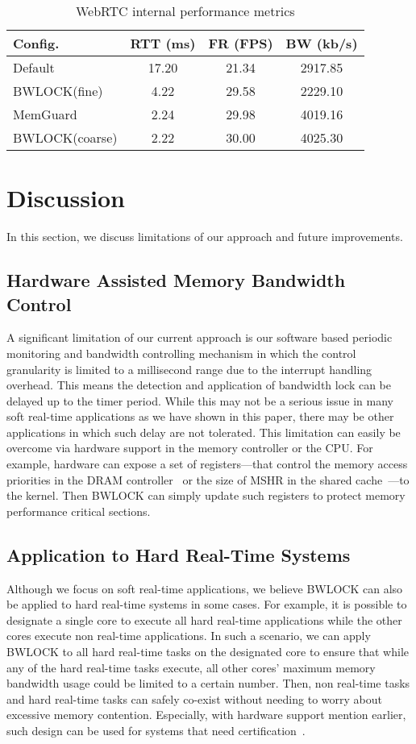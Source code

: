 \documentclass[times, 10pt,onecolumn]{article}
\newcommand{\bottomrule}{\hline}
\newcommand{\toprule}{\hline}
\newcommand{\midrule}{\hline}
\begin{document}
\begin{table}[htbp]
\centering
\begin{tabular}{lccc}
\toprule
Config. & RTT (ms) & FR (FPS) & BW (kb/s) \\
\midrule
Default & 17.20 & 21.34 & 2917.85 \\
BWLOCK(fine) & 4.22 & 29.58 & 2229.10 \\
MemGuard & 2.24 & 29.98 & 4019.16 \\
BWLOCK(coarse) & 2.22 & 30.00 & 4025.30 \\
\bottomrule
\end{tabular}\caption{WebRTC internal performance metrics}
\label{tbl:webrtc-metrics}\end{table}



\section{Discussion} \label{sec:discussion}
In this section, we discuss limitations of our approach and future
improvements. 

\subsection{Hardware Assisted Memory Bandwidth Control}
A significant limitation of our current approach is our software based
periodic monitoring and bandwidth controlling mechanism in which the
control granularity is limited to a millisecond range due to the
interrupt handling overhead. This means the detection and application
of bandwidth lock can be delayed up to the timer period. While this
may not be a serious issue in many soft real-time applications as we
have shown in this paper, there may be other applications in which such
delay are not tolerated. This limitation can easily be overcome via
hardware support in the memory controller or the CPU. For example, 
hardware can expose a set of registers---that control the memory
access priorities in the DRAM controller~\cite{kim2010thread} or the
size of MSHR in the shared cache~\cite{ebrahimi2010fairness}---to the
kernel. Then BWLOCK can simply update such registers to protect memory
performance critical sections. 

\subsection{Application to Hard Real-Time Systems}
Although we focus on soft real-time applications, we believe BWLOCK can
also be applied to hard real-time systems in some cases. For example,
it is possible to designate a single core to execute all hard
real-time applications while the other cores execute non real-time
applications. In such a scenario, we can apply BWLOCK to all hard
real-time tasks on the designated core to ensure that while any of the
hard real-time tasks execute, all other cores' maximum memory
bandwidth usage could be limited to a certain number. Then, non
real-time tasks and hard real-time tasks can safely co-exist without
needing to worry about excessive memory contention. Especially, with
hardware support mention earlier, such design can be used for systems
that need certification~\cite{faa2014certification}. 
\end{document}

